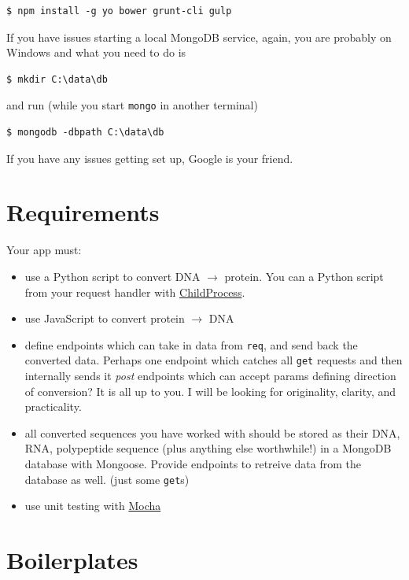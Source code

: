 \begin{verbatim}
$ npm install -g yo bower grunt-cli gulp
\end{verbatim}

If you have issues starting a local MongoDB service, again, you are probably on
Windows and what you need to do is 

\begin{verbatim}
$ mkdir C:\data\db    
\end{verbatim}

and run (while you start \texttt{mongo} in another terminal) 

\begin{verbatim}
$ mongodb -dbpath C:\data\db  
\end{verbatim}
If you have any issues getting set up, Google is your friend. 

\section{Requirements}

Your app must:
\begin{itemize}
    \item use a Python script to convert DNA $\rightarrow$ protein. You can a
        Python script from your request handler with
        \href{https://nodejs.org/api/child_process.html}{ChildProcess}.
    \item use JavaScript to convert protein $\rightarrow$ DNA
    \item define endpoints which can take in data from \texttt{req}, and send
        back the converted data. Perhaps one endpoint which catches all
        \texttt{get} requests and then internally sends it \textit{post}
        endpoints which can accept params defining direction of conversion? It
        is all up to you. I will be looking for originality, clarity, and
    practicality.  
    \item all converted sequences you have worked with should be stored as their
        DNA, RNA, polypeptide sequence (plus anything else worthwhile!) in a MongoDB
        database with Mongoose. Provide endpoints to retreive data from the database as
        well. (just some \texttt{get}s) 
    \item use unit testing with \href{http://mochajs.org/}{Mocha} 
\end{itemize}

\section{Boilerplates}

